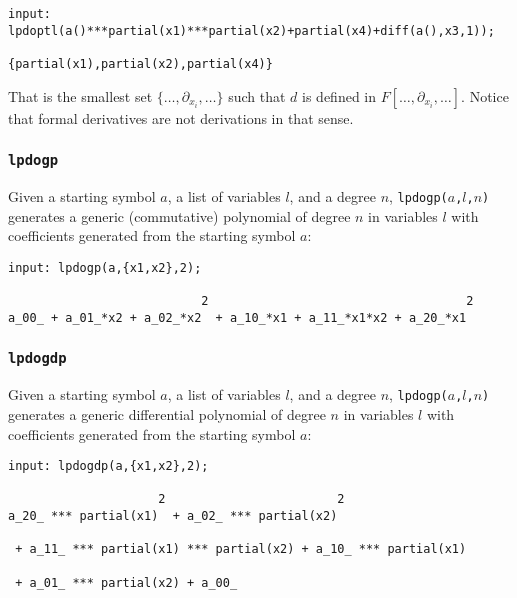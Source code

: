 \documentclass[a4paper]{article}
\begin{document}
\begin{footnotesize}
\begin{verbatim}
input: lpdoptl(a()***partial(x1)***partial(x2)+partial(x4)+diff(a(),x3,1));

{partial(x1),partial(x2),partial(x4)}
\end{verbatim}
\end{footnotesize}
That is the smallest set $\{\dots,\partial_{x_i},\dots\}$ such that
$d$ is defined in $F[\dots,\partial_{x_i},\dots]$. Notice that formal
derivatives are not derivations in that sense.

\subsubsection{\texttt{lpdogp}}
Given a starting symbol $a$, a list of variables $l$, and a degree
$n$, \texttt{lpdogp($a$,$l$,$n$)} generates a generic (commutative)
polynomial of degree $n$ in variables $l$ with coefficients generated
from the starting symbol $a$:

\begin{footnotesize}
\begin{verbatim}
input: lpdogp(a,{x1,x2},2);

                           2                                    2
a_00_ + a_01_*x2 + a_02_*x2  + a_10_*x1 + a_11_*x1*x2 + a_20_*x1
\end{verbatim}
\end{footnotesize}

\subsubsection{\texttt{lpdogdp}}
Given a starting symbol $a$, a list of variables $l$, and a degree
$n$, \texttt{lpdogp($a$,$l$,$n$)} generates a generic differential
polynomial of degree $n$ in variables $l$ with coefficients generated
from the starting symbol $a$:

\begin{footnotesize}
\begin{verbatim}
input: lpdogdp(a,{x1,x2},2);

                     2                        2
a_20_ *** partial(x1)  + a_02_ *** partial(x2)

 + a_11_ *** partial(x1) *** partial(x2) + a_10_ *** partial(x1)

 + a_01_ *** partial(x2) + a_00_
\end{verbatim}
\end{footnotesize}
\end{document}
